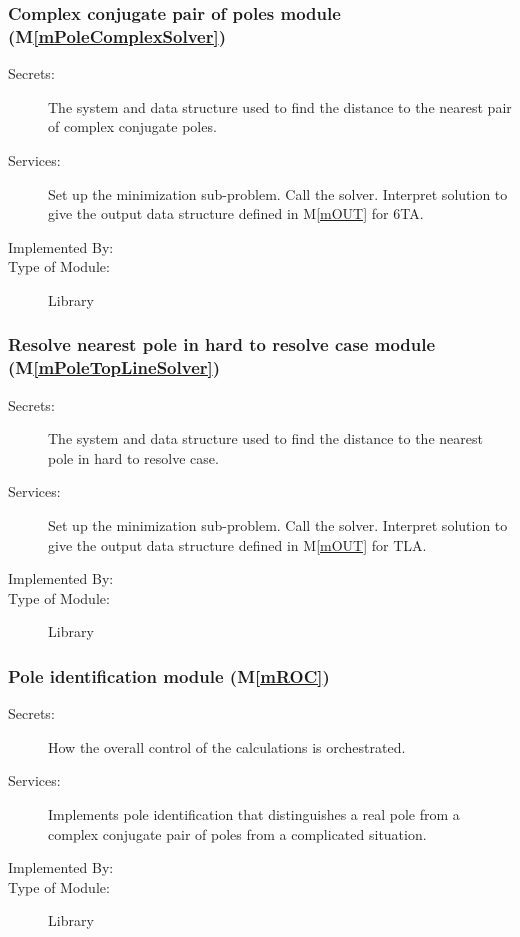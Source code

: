 \documentclass[12pt, titlepage]{article}
\newcommand{\mref}[1]{M\ref{#1}}
\begin{document}
\subsubsection{Complex conjugate pair of poles module (\mref{mPoleComplexSolver})}

\begin{description}
\item[Secrets:] The system and data structure used to find the distance to the nearest
  pair of complex conjugate poles.
\item[Services:] Set up the minimization sub-problem. Call the solver. Interpret
  solution to give the output data structure defined in \mref{mOUT} for 6TA.
\item[Implemented By:] 
\item[Type of Module:] Library
\end{description}

\subsubsection{Resolve nearest pole in hard to resolve case module (\mref{mPoleTopLineSolver})}

\begin{description}
\item[Secrets:] The system and data structure used to find the distance to the nearest
  pole in hard to resolve case.
\item[Services:] Set up the minimization sub-problem. Call the solver. Interpret
  solution to give the output data structure defined in \mref{mOUT} for TLA.
\item[Implemented By:] 
\item[Type of Module:] Library
\end{description}

\subsubsection{Pole identification module (\mref{mROC})}

\begin{description}
\item[Secrets:] How the overall control of the calculations is orchestrated.
\item[Services:] Implements pole identification that distinguishes a real pole from
  a complex conjugate pair of poles from a complicated situation.
\item[Implemented By:] 
\item[Type of Module:] Library
\end{description}
\end{document}
